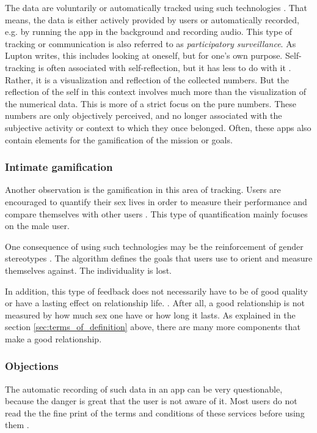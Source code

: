 The data are voluntarily or automatically tracked using such technologies \cite{doi:10.1080/15265161.2017.1409823}. That means, the data is either actively provided by users or automatically recorded, e.g. by running the app in the background and recording audio.
This type of tracking or communication is also referred to as \textit{participatory surveillance}. As Lupton \cite{doi:10.1080/13691058.2014.920528} writes, this includes looking at oneself, but for one's own purpose. Self-tracking is often associated with self-reflection, but it has less to do with it \cite{lupton2016quantified}. Rather, it is a visualization and reflection of the collected numbers. But the reflection of the self in this context involves much more than the visualization of the numerical data. This is more of a strict focus on the pure numbers. These numbers are only objectively perceived, and no longer associated with the subjective activity or context to which they once belonged.
Often, these apps also contain elements for the gamification of the mission or goals.

\subsubsection{Intimate gamification}
Another observation is the gamification in this area of tracking. Users are encouraged to quantify their sex lives in order to measure their performance and compare themselves with other users \cite{doi:10.1080/13691058.2014.920528}. This type of quantification mainly focuses on the male user.

One consequence of using such technologies may be the reinforcement of gender stereotypes \cite{doi:10.1080/13691058.2014.920528}. The algorithm defines the goals that users use to orient and measure themselves against. The individuality is lost.

In addition, this type of feedback does not necessarily have to be of good quality or have a lasting effect on relationship life. \cite{doi:10.1080/15265161.2017.1409823}. After all, a good relationship is not measured by how much sex one have or how long it lasts. As explained in the section \ref{sec:terms_of_definition} above, there are many more components that make a good relationship.

\subsubsection{Objections}
The automatic recording of such data in an app can be very questionable, because the danger is great that the user is not aware of it. Most users do not read the the fine print of the terms and conditions of these services before using them \cite{levy2014intimate}.

